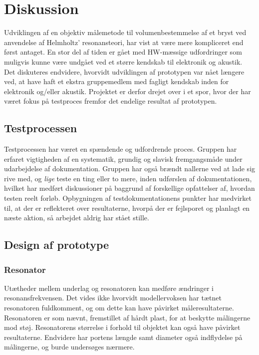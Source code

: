 \chapter{Diskussion}
Udviklingen af en objektiv målemetode til volumenbestemmelse af et bryst ved anvendelse af Helmholtz' resonansteori, har vist at være mere kompliceret end først antaget. En stor del af tiden er gået med HW-mæssige udfordringer som muligvis kunne være undgået ved et større kendskab til elektronik og akustik. Det diskuteres endvidere, hvorvidt udviklingen af prototypen var nået længere ved, at have haft et ekstra gruppemedlem med fagligt kendskab inden for elektronik og/eller akustik. Projektet er derfor drejet over i et spor, hvor der har været fokus på testproces fremfor det endelige resultat af prototypen. 

\section{Testprocessen}    
Testprocessen har været en spændende og udfordrende proces. Gruppen har erfaret vigtigheden af en systematik, grundig og slavisk fremgangsmåde under udarbejdelse af dokumentation. Gruppen har også brændt nallerne ved at lade sig rive med, og \textit{lige} teste en ting eller to mere, inden udførslen af dokumentationen, hvilket har medført diskussioner på baggrund af forskellige opfattelser af, hvordan testen reelt forløb.  
Opbygningen af testdokumentationens punkter har medvirket til, at der er reflekteret over resultaterne, hvorpå der er fejlsporet og planlagt en næste aktion, så arbejdet aldrig har stået stille.    

\section{Design af prototype}
\subsection{Resonator}
Utætheder mellem underlag og resonatoren kan medføre ændringer i resonansfrekvensen. Det vides ikke hvorvidt modellervoksen har tætnet resonatoren fuldkomment, og om dette kan have påvirket måleresultaterne. Resonatoren er som nævnt, fremstillet af hårdt plast, for at beskytte målingerne mod støj. Resonatorens størrelse i forhold til objektet kan også have påvirket resultaterne. Endvidere har portens længde samt diameter også indflydelse på målingerne, og burde undersøges nærmere. 

